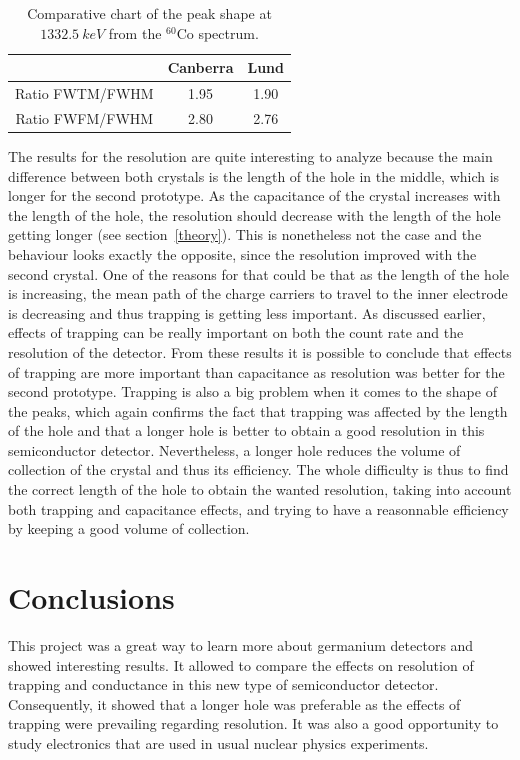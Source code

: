 \documentclass[11pt,a4paper]{article}
\begin{document}
\begin{table}[!h]
\centering
\caption{Comparative chart of the peak shape at $1332.5~keV$ from the $^{60}$Co spectrum.}
\label{shape2}
\begin{tabular}{c|c|c|}
\cline{2-3}
                                      & Canberra & Lund \\ \hline
\multicolumn{1}{|c|}{Ratio FWTM/FWHM} & 1.95     & 1.90 \\ \hline
\multicolumn{1}{|c|}{Ratio FWFM/FWHM} & 2.80     & 2.76 \\ \hline
\end{tabular}
\end{table}

The results for the resolution are quite interesting to analyze because the main difference between both crystals is the length of the hole in the middle, which is longer for the second prototype. As the capacitance of the crystal increases with the length of the hole, the resolution should decrease with the length of the hole getting longer (see section~\ref{theory}). This is nonetheless not the case and the behaviour looks exactly the opposite, since the resolution improved with the second crystal. One of the reasons for that could be that as the length of the hole is increasing, the mean path of the charge carriers to travel to the inner electrode is decreasing and thus trapping is getting less important. As discussed earlier, effects of trapping can be really important on both the count rate and the resolution of the detector. From these results it is possible to conclude that effects of trapping are more important than capacitance as resolution was better for the second prototype. Trapping is also a big problem when it comes to the shape of the peaks, which again confirms the fact that trapping was affected by the length of the hole and that a longer hole is better to obtain a good resolution in this semiconductor detector. Nevertheless, a longer hole reduces the volume of collection of the crystal and thus its efficiency. The whole difficulty is thus to find the correct length of the hole to obtain the wanted resolution, taking into account both trapping and capacitance effects, and trying to have a reasonnable efficiency by keeping a good volume of collection.

\section{Conclusions}

This project was a great way to learn more about germanium detectors and showed interesting results. It allowed to compare the effects on resolution of trapping and conductance in this new type of semiconductor detector. Consequently, it showed that a longer hole was preferable as the effects of trapping were prevailing regarding resolution. It was also a good opportunity to study electronics that are used in usual nuclear physics experiments.
\end{document}
